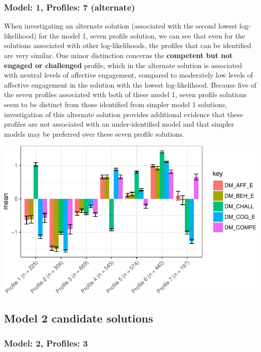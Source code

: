 \documentclass[]{book}
\theoremstyle{definition}
\theoremstyle{definition}
\theoremstyle{definition}
\theoremstyle{remark}
\begin{document}
\subsubsection{Model: 1, Profiles: 7
(alternate)}\label{model-1-profiles-7-alternate}

When investigating an alternate solution (associated with the second
lowest log-likelihood) for the model 1, seven profile solution, we can
see that even for the solutions associated with other log-likelihoods,
the profiles that can be identified are very similar. One minor
distinction concerns the \textbf{competent but not engaged or
challenged} profile, which in the alternate solution is associated with
neutral levels of affective engagement, compared to moderately low
levels of affective engagement in the solution with the lowest
log-likelihood. Because five of the seven profiles associated with both
of these model 1, seven profile solutions seem to be distinct from those
identified from simpler model 1 solutions, investigation of this
alternate solution provides additional evidence that these profiles are
not associated with an under-identified model and that simpler models
may be preferred over these seven profile solutions.

\begin{center}\includegraphics[width=0.8\linewidth]{rosenberg-dissertation_files/figure-latex/m1_7-other-LL-p-1} \end{center}

\subsection{Model 2 candidate
solutions}\label{model-2-candidate-solutions}

\subsubsection{Model: 2, Profiles: 3}\label{model-2-profiles-3}
\end{document}
